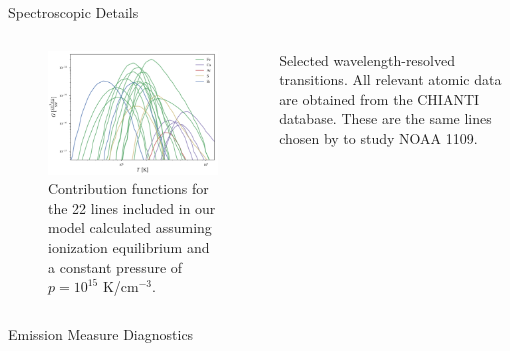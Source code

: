 \documentclass[final]{beamer}
\begin{document}
\begin{frame}
\begin{columns}[T]
\begin{column}{0.49\linewidth}
\begin{block}{Spectroscopic Details}
\begin{columns}[T]
\begin{column}{0.49\columnwidth}
\begin{figure}
            \includegraphics[width=\columnwidth]{figures/contribution_functions.pdf}
            \caption{Contribution functions for the 22 lines included in our model calculated assuming ionization equilibrium and a constant pressure of $p=10^{15}$ K/$\mathrm{cm}^{-3}$.}    
          \end{figure}
        \end{column}
        \begin{column}{0.49\columnwidth}
          \vspace{2ex}
          \begin{table}
            \centering
            \begin{minipage}{0.49\columnwidth}
              
            \end{minipage}
            \begin{minipage}{0.49\columnwidth}
              
            \end{minipage}
            \caption{Selected wavelength-resolved transitions. All relevant atomic data are obtained from the CHIANTI database. These are the same lines chosen by \citet{warren_systematic_2012} to study NOAA 1109. \label{tab:line_table}}
          \end{table}
        \end{column}
      \end{columns}
    \end{block}
    \begin{block}{Emission Measure Diagnostics}
      \begin{itemize}

\end{itemize}
\end{block}
\end{column}
\end{columns}
\end{frame}
\end{document}

